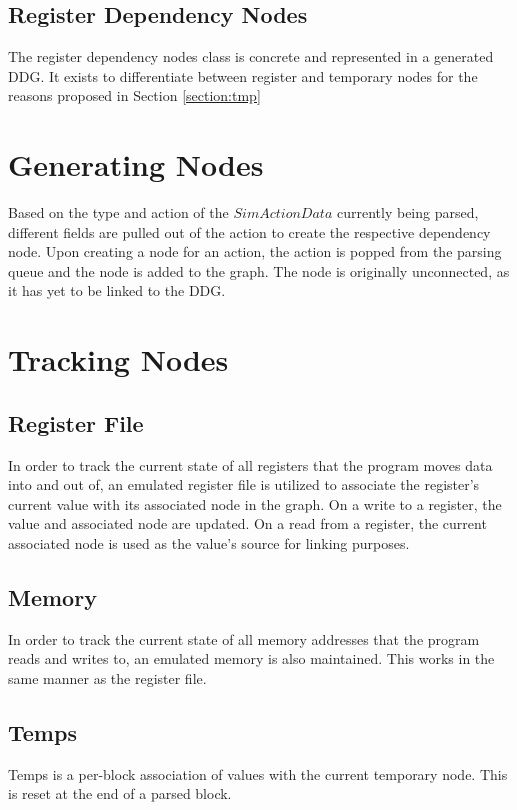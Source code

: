\subsection{Register Dependency Nodes}
The register dependency nodes class is concrete and represented in a generated DDG. It exists to differentiate between register and temporary nodes for the reasons proposed in Section \ref{section:tmp}

\section{Generating Nodes}
Based on the type and action of the $SimActionData$ currently being parsed, different fields are pulled out of the action to create the respective dependency node. Upon creating a node for an action, the action is popped from the parsing queue and the node is added to the graph. The node is originally unconnected, as it has yet to be linked to the DDG.  

\section {Tracking Nodes}

\subsection{Register File}
In order to track the current state of all registers that the program moves data into and out of, an emulated register file is utilized to associate the register’s current value with its associated node in the graph. On a write to a register, the value and associated node are updated. On a read from a register, the current associated node is used as the value’s source for linking purposes. 
\subsection{Memory}
In order to track the current state of all memory addresses that the program reads and writes to, an emulated memory is also maintained. This works in the same manner as the register file. 

\subsection{Temps}
Temps is a per-block association of values with the current temporary node. This is reset at the end of a parsed block.

